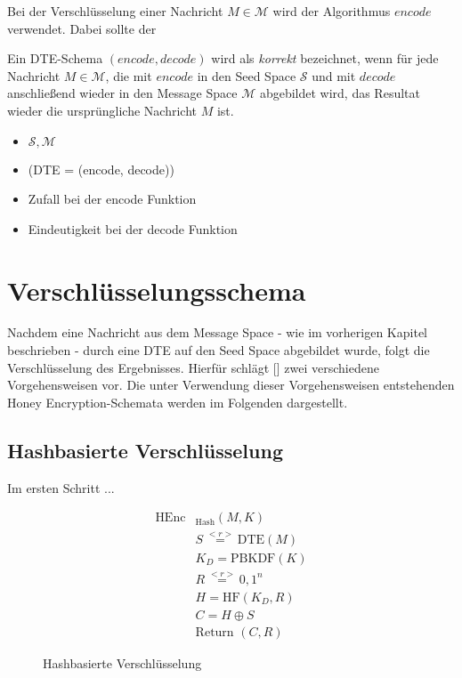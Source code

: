 \documentclass[12pt]{scrartcl}
\begin{document}
Bei der Verschlüsselung einer Nachricht $M \in \mathcal{M}$ wird der Algorithmus $encode$ verwendet. Dabei sollte der 




Ein DTE-Schema $(encode, decode)$ wird als \emph{korrekt} bezeichnet, wenn für jede Nachricht $M \in \mathcal{M}$, die mit $encode$ in den Seed Space $\mathcal{S}$ und mit $decode$ anschließend wieder in den Message Space $\mathcal{M}$ abgebildet wird, das Resultat wieder die ursprüngliche Nachricht $M$  ist. 


\begin{itemize}
\item $\mathcal{S}, \mathcal{M}$
\item (DTE = (encode, decode))
\item Zufall bei der encode Funktion
\item Eindeutigkeit bei der decode Funktion
\end{itemize}

\newpage
\section{Verschlüsselungsschema}
\label{sec:schema}
Nachdem eine Nachricht aus dem Message Space - wie im vorherigen Kapitel beschrieben - durch eine DTE auf den Seed Space abgebildet wurde, folgt die Verschlüsselung des Ergebnisses. Hierfür schlägt [\cite{EURO2014}] zwei verschiedene Vorgehensweisen vor. Die unter Verwendung dieser Vorgehensweisen entstehenden Honey Encryption-Schemata werden im Folgenden dargestellt.

\subsection{Hashbasierte Verschlüsselung}

Im ersten Schritt ...

\begin{figure}[h]
	\begin{align*}
		\text{HEnc}&_{\text{Hash}}(M, K)\\
		&S \overset{<r>}{=} \text{DTE}(M)\\ 	%
		&K_D = \text{PBKDF}(K)\\ 		%
		&R \overset{<r>}{=} {0,1}^n\\	%
		&H = \text{HF}(K_D,R)\\	%
		&C = H \oplus S\\	%
		&\text{Return } (C,R)
	\end{align*}
	\caption{Hashbasierte Verschlüsselung}
	\label{fig:HashEnc}
\end{figure}
\end{document}
